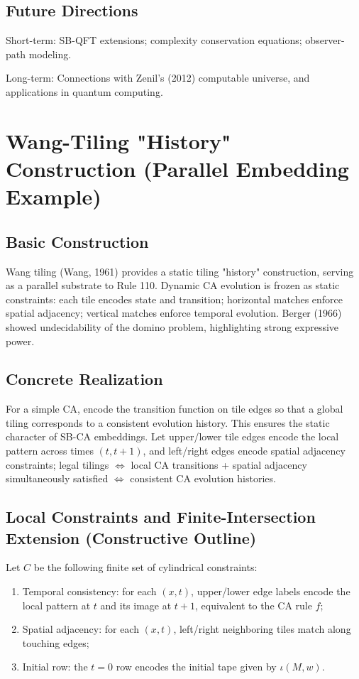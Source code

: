 \documentclass[12pt]{article}
\theoremstyle{plain}
\theoremstyle{definition}
\begin{document}
\subsection{Future Directions}

Short-term: SB-QFT extensions; complexity conservation equations; observer-path modeling.

Long-term: Connections with Zenil's (2012)\cite{zenil2012} computable universe, and applications in quantum computing.

\appendix

\section{Wang-Tiling "History" Construction (Parallel Embedding Example)}

\subsection{Basic Construction}

Wang tiling (Wang, 1961)\cite{wang1961} provides a static tiling "history" construction, serving as a parallel substrate to Rule 110. Dynamic CA evolution is frozen as static constraints: each tile encodes state and transition; horizontal matches enforce spatial adjacency; vertical matches enforce temporal evolution. Berger (1966)\cite{berger1966} showed undecidability of the domino problem, highlighting strong expressive power.

\subsection{Concrete Realization}

For a simple CA, encode the transition function on tile edges so that a global tiling corresponds to a consistent evolution history. This ensures the static character of SB-CA embeddings. Let upper/lower tile edges encode the local pattern across times $(t,t+1)$, and left/right edges encode spatial adjacency constraints; legal tilings $\Leftrightarrow$ local CA transitions + spatial adjacency simultaneously satisfied $\Leftrightarrow$ consistent CA evolution histories.

\subsection{Local Constraints and Finite-Intersection Extension (Constructive Outline)}

Let $C$ be the following finite set of cylindrical constraints:
\begin{enumerate}
\item Temporal consistency: for each $(x,t)$, upper/lower edge labels encode the local pattern at $t$ and its image at $t+1$, equivalent to the CA rule $f$;
\item Spatial adjacency: for each $(x,t)$, left/right neighboring tiles match along touching edges;
\item Initial row: the $t=0$ row encodes the initial tape given by $\iota(M,w)$.
\end{enumerate}
\end{document}
